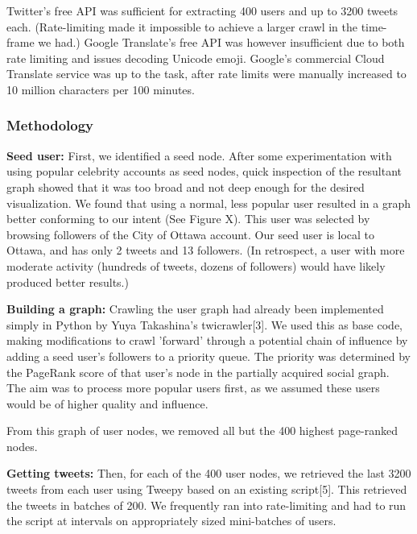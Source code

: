 \documentclass[11pt]{article}
\begin{document}
Twitter's free API was sufficient for extracting 400 users and up to 3200 tweets each. (Rate-limiting made it impossible to achieve a larger crawl in the time-frame we had.) Google Translate's free API was however insufficient due to both rate limiting and issues decoding Unicode emoji. Google's commercial Cloud Translate service was up to the task, after rate limits were manually increased to 10 million characters per 100 minutes.\newline

\subsubsection{Methodology}

\textbf{Seed user:} First, we identified a seed node. After some experimentation with using popular celebrity accounts as seed nodes, quick inspection of the resultant graph showed that it was too broad and not deep enough for the desired visualization. We found that using a normal, less popular user resulted in a graph better conforming to our intent (See Figure X). This user was selected by browsing followers of the City of Ottawa account. Our seed user is local to Ottawa, and has only 2 tweets and 13 followers. (In retrospect, a user with more moderate activity (hundreds of tweets, dozens of followers) would have likely produced better results.)\newline

\textbf{Building a graph:} Crawling the user graph had already been implemented simply in Python by Yuya Takashina's twicrawler[3]. We used this as base code, making modifications to crawl 'forward' through a potential chain of influence by adding a seed user's followers to a priority queue. The priority was determined by the PageRank score of that user's node in the partially acquired social graph. The aim was to process more popular users first, as we assumed these users would be of higher quality and influence.

From this graph of user nodes, we removed all but the 400 highest page-ranked nodes.\newline

\textbf{Getting tweets:} Then, for each of the 400 user nodes, we retrieved the last 3200 tweets from each user using Tweepy based on an existing script[5]. This retrieved the tweets in batches of 200. We frequently ran into rate-limiting and had to run the script at intervals on appropriately sized mini-batches of users.\newline
\end{document}
